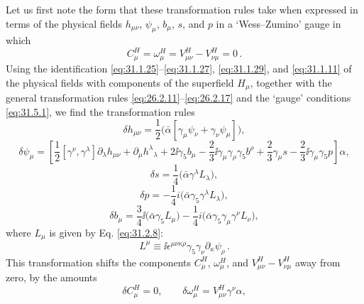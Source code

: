 Let us first note the form that these transformation rules take when
expressed in terms of the physical fields \(h_{\mu\nu}\), \(\psi_\mu\),
\(b_\mu\), \(s\), and \(p\) in a `Wess--Zumino' gauge in which
\begin{equation}
  C_\mu^H=\omega_\mu^H=V_{\mu\nu}^H-V_{\nu\mu}^H=0\,.
  \tag{31.5.1}\label{eq:31.5.1}
\end{equation}
Using the identification \eqref{eq:31.1.25}--\eqref{eq:31.1.27},
\eqref{eq:31.1.29}, and \eqref{eq:31.1.11} of the physical fields with
components of the superfield \(H_\mu\), together with the general
transformation rules \eqref{eq:26.2.11}--\eqref{eq:26.2.17} and the
`gauge' conditions \eqref{eq:31.5.1}, we find the transformation rules
\begin{equation}
  \delta h_{\mu\nu}
  =\frac{1}{2}\bigl(\bar\alpha
    [\gamma_\mu\psi_\nu+\gamma_\nu\psi_\mu]\bigr),
  \tag{31.5.2}\label{eq:31.5.2}
\end{equation}
\begin{equation}
  \delta\psi_\mu
  =\left[
      \frac{1}{2}[\gamma^\nu,\gamma^\lambda]\partial_\lambda h_{\mu\nu}
      +\partial_\mu h^\lambda{}_\lambda
      +2\ii\gamma_5b_\mu
      -\frac{2}{3}\ii\gamma_\mu\gamma_\rho\gamma_5b^\rho
      +\frac{2}{3}\gamma_\mu s
      -\frac{2}{3}\ii\gamma_\mu\gamma_5p
    \right]\alpha,
  \tag{31.5.3}\label{eq:31.5.3}
\end{equation}
\begin{equation}
  \delta s=\frac{1}{4}\bigl(\bar\alpha\gamma^\lambda L_\lambda\bigr),
  \tag{31.5.4}\label{eq:31.5.4}
\end{equation}
\begin{equation}
  \delta p=-\frac{1}{4}i
    \bigl(\bar\alpha\gamma_5\gamma^\lambda L_\lambda\bigr),
  \tag{31.5.5}\label{eq:31.5.5}
\end{equation}
\begin{equation}
  \delta b_\mu
  =\frac{3}{4}\ii\bigl(\bar\alpha\gamma_5L_\mu\bigr)
   -\frac{1}{4}i
    \bigl(\bar\alpha\gamma_5\gamma_\mu\gamma^\nu L_\nu\bigr),
  \tag{31.5.6}\label{eq:31.5.6}
\end{equation}
where \(L_\mu\) is given by Eq. \eqref{eq:31.2.8}:
\[
  L^\mu\equiv
  \ii\epsilon^{\mu\nu\kappa\rho}\gamma_5\gamma_\nu
  \partial_\kappa\psi_\rho\,.
\]
This transformation shifts the components \(C_\mu^H\), \(\omega_\mu^H\),
and \(V_{\mu\nu}^H-V_{\nu\mu}^H\) away from zero, by the amounts
\begin{equation}
  \delta C_\mu^H=0,\qquad
  \delta\omega_\mu^H=V_{\mu\nu}^H\gamma^\nu\alpha,
  \tag{31.5.7}\label{eq:31.5.7}
\end{equation}
